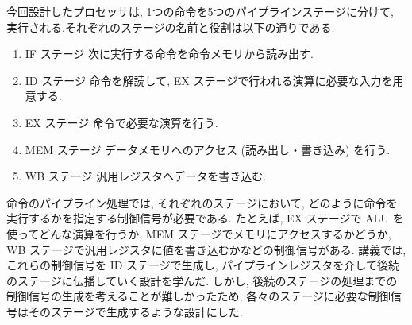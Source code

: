\documentclass[../specifications.tex]{subfiles}
\begin{document}
  今回設計したプロセッサは, 1つの命令を5つのパイプラインステージに分けて, 
  実行される.それぞれのステージの名前と役割は以下の通りである.
  \begin{enumerate}
    \item IF ステージ
    \newline 次に実行する命令を命令メモリから読み出す.

    \item ID ステージ
    \newline 命令を解読して, EX ステージで行われる演算に必要な入力を用意する.

    \item EX ステージ
    \newline 命令で必要な演算を行う.

    \item MEM ステージ
    \newline データメモリへのアクセス (読み出し・書き込み) を行う.

    \item WB ステージ
    \newline 汎用レジスタへデータを書き込む.
  \end{enumerate}

  命令のパイプライン処理では, それぞれのステージにおいて, 
  どのように命令を実行するかを指定する制御信号が必要である.
  たとえば, EX ステージで ALU を使ってどんな演算を行うか, 
  MEM ステージでメモリにアクセスするかどうか, 
  WB ステージで汎用レジスタに値を書き込むかなどの制御信号がある.
  講義では, これらの制御信号を ID ステージで生成し, 
  パイプラインレジスタを介して後続のステージに伝播していく設計を学んだ.
  しかし, 後続のステージの処理までの制御信号の生成を考えることが難しかったため, 
  各々のステージに必要な制御信号はそのステージで生成するような設計にした.

  
\end{document}
